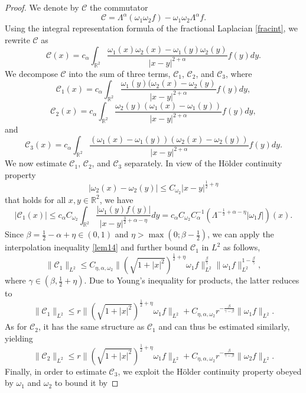 \documentclass[12pt,reqno]{amsart}
\newcommand{\be}{\begin{equation}}
\newcommand{\ee}{\end{equation}}
\newcommand{\R}{\mathbb R}
\begin{document}
\begin{proof}
We denote by $\mathcal{C}$ the commutator 
\be 
\mathcal{C} = \Lambda^{\alpha}(\omega_1 \omega_2 f) - \omega_1 \omega_2 \Lambda^{\alpha}f.
\ee Using the integral representation formula of the fractional Laplacian \eqref{fracint},  we rewrite $\mathcal{C}$ as 
\be 
\mathcal{C}(x) = c_{\alpha} \int_{\R^2} \frac{\omega_1(x) \omega_2(x) - \omega_1(y) \omega_2(y)}{|x-y|^{2+\alpha}} f(y)dy. 
\ee We decompose $\mathcal{C}$ into the sum of three terms, $\mathcal{C}_1$, $\mathcal{C}_2$, and $\mathcal{C}_3$, where
\be 
\mathcal{C}_{1}(x) = c_{\alpha} \int_{\R^2} \frac{\omega_1(y) (\omega_2(x) -\omega_2(y)}{|x-y|^{2+{\alpha}}} f(y)dy,
\ee 
\be 
\mathcal{C}_{2}(x) = c_{\alpha} \int_{\R^2} \frac{\omega_2(y) (\omega_1(x) - \omega_1(y))}{|x-y|^{2+{\alpha}}} f(y)dy, 
\ee and 
\be 
\mathcal{C}_{3}(x) = c_{\alpha} \int_{\R^2} \frac{(\omega_1(x)- \omega_1(y)) (\omega_2(x) - \omega_2(y))}{|x-y|^{2+{\alpha}}} f(y)dy. 
\ee We now estimate $\mathcal{C}_{1}$,  $\mathcal{C}_{2}$, and $\mathcal{C}_3$ separately. In view of the H\"older continuity property 
\be 
|\omega_2(x) - \omega_2(y)| \le C_{\omega_2}|x-y|^{\frac{1}{2}+\eta} 
\ee that holds for all $x, y \in \R^2$, we have 
\be 
|\mathcal{C}_1(x)|
\le c_{\alpha}C_{\omega_2} \int_{\R^2} \frac{|\omega_1(y)f(y)|}{|x-y|^{\frac{3}{2}+\alpha-\eta}} dy = c_{\alpha}C_{\omega_2} C_{\alpha}^{-1}(\Lambda^{-\frac{1}{2}+\alpha - \eta} |\omega_1 f|)(x). 
\ee Since $\beta = \frac{1}{2} - \alpha + \eta \in (0,1)$ and $\eta > \max \left(0; \beta - \frac{1}{2}\right)$, we can apply  the interpolation inequality \eqref{lem14} and further bound $\mathcal{C}_1$ in $L^2$ as follows,
\be 
\|\mathcal{C}_1\|_{L^2} 
\le C_{\eta, \alpha, \omega_2}  \|(\sqrt{1+|x|^2})^{\frac{1}{2}+\eta} \omega_1 f\|_{L^2}^{\frac{\beta}{\gamma}} \|\omega_1 f\|_{L^2}^{1-\frac{\beta}{\gamma}},
\ee where $\gamma \in \left(\beta, \frac{1}{2}+\eta \right)$. Due to Young's inequality for products, the latter reduces to 
\be \label{prop31}
\|\mathcal{C}_1\|_{L^2} 
\le  r \|(\sqrt{1+|x|^2})^{\frac{1}{2}+\eta} \omega_1 f\|_{L^2} + C_{\eta, \alpha, \omega_2}r^{-\frac{\beta}{\gamma - \beta}} \|\omega_1 f\|_{L^2}.
\ee As for $\mathcal{C}_2$, it has the same structure as $\mathcal{C}_1$ and can thus be estimated similarly, yielding
\be \label{prop32}
\|\mathcal{C}_2\|_{L^2} 
\le  r \|(\sqrt{1+|x|^2})^{\frac{1}{2}+\eta} \omega_1 f\|_{L^2} + C_{\eta, \alpha, \omega_2}r^{-\frac{\beta}{\gamma - \beta}} \|\omega_2 f\|_{L^2}.
\ee Finally, in order to estimate $\mathcal{C}_3$, we exploit the H\"older continuity property obeyed by $\omega_1$ and $\omega_2$ to bound it by 

\end{proof}
\end{document}
